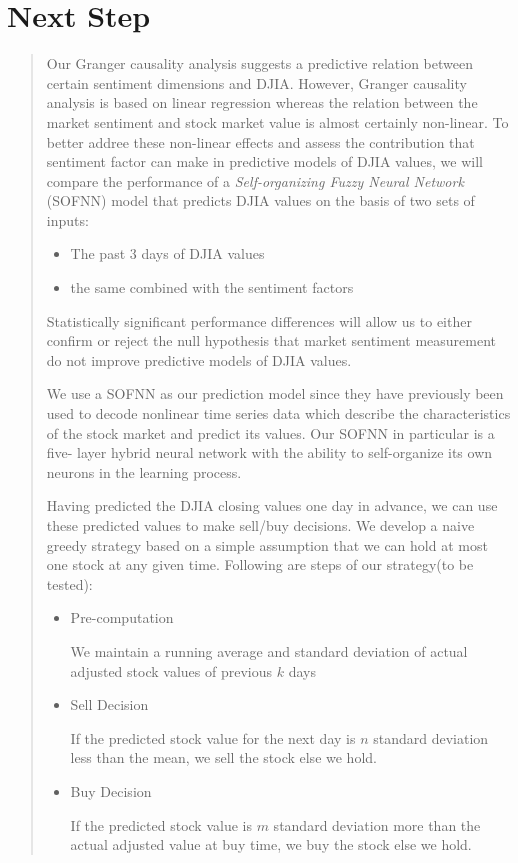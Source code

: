 \documentclass[english]{article}
\begin{document}
\section{Next Step}
\begin{quotation}
Our Granger causality analysis suggests a predictive relation between
certain sentiment dimensions and DJIA. However, Granger causality
analysis is based on linear regression whereas the relation between
the market sentiment and stock market value is almost certainly non-linear.
To better addree these non-linear effects and assess the contribution
that sentiment factor can make in predictive models of DJIA values,
we will compare the performance of a \emph{Self-organizing Fuzzy Neural
Network} (SOFNN) model that predicts DJIA values on the basis of two
sets of inputs: 
\begin{itemize}
\item The past 3 days of DJIA values 
\item the same combined with the sentiment factors
\end{itemize}
Statistically significant performance differences will allow us to
either confirm or reject the null hypothesis that market sentiment
measurement do not improve predictive models of DJIA values.

We use a SOFNN as our prediction model since they have previously
been used to decode nonlinear time series data which describe the
characteristics of the stock market and predict its values. Our SOFNN
in particular is a five- layer hybrid neural network with the ability
to self-organize its own neurons in the learning process. 

Having predicted the DJIA closing values one day in advance, we can
use these predicted values to make sell/buy decisions. We develop
a naive greedy strategy based on a simple assumption that we can hold
at most one stock at any given time. Following are steps of our strategy(to
be tested):
\begin{itemize}
\item Pre-computation

We maintain a running average and standard deviation of actual adjusted
stock values of previous $k$ days
\item Sell Decision

If the predicted stock value for the next day is $n$ standard deviation
less than the mean, we sell the stock else we hold.
\item Buy Decision

If the predicted stock value is $m$ standard deviation more than
the actual adjusted value at buy time, we buy the stock else we hold.
\end{itemize}
\end{quotation}
\end{document}
